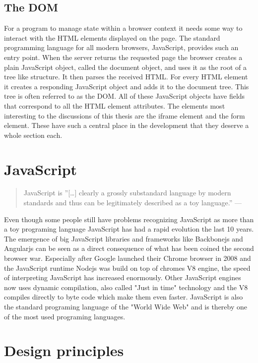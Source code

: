 \documentclass[english]{ifimaster}
\begin{document}
\subsection{The DOM}
For a program to manage state within a browser context it needs some way to interact with the HTML elements displayed on the page. The standard programming language for all modern browsers, JavaScript, provides such an entry point. When the server returns the requested page the browser creates a plain JavaScript object, called the document object, and uses it as the root of a tree like structure. It then parses the received HTML. For every HTML element it creates a responding JavaScript object and adds it to the document tree. This tree is often referred to as the DOM. All of these JavaScript objects have fields that correspond to all the HTML element attributes. The elements most interesting to the discussions of this thesis are the iframe element and the form element. These have such a central place in the development that they deserve a whole section each.


\section{JavaScript}
\begin{quotation}
\noindent JavaScript is ”[…] clearly a grossly substandard language by modern
standards and thus can be legitimately described as a toy language.” —
\parencite{arno}
\end{quotation}

Even though some people still have problems recognizing JavaScript as more than a toy programing language JavaScript has had a rapid evolution the last 10 years. The emergence of  big JavaScript libraries and frameworks like Backbonejs and Angularjs can be seen as a direct consequence of what has been coined the second browser war\parencite{Yule2013}. Especially after Google launched their Chrome browser in 2008 and the JavaScript runtime Nodejs was build on top of chromes V8 engine, the speed of interpreting JavaScript has increased enormously. Other JavaScript engines now uses dynamic compilation, also called "Just in time" technology and the V8 compiles directly to byte code which make them even faster\parencite{anand}. JavaScript is also the standard programing language of the "World Wide Web"\parencite[p. 1]{flanagan} and is thereby one of the most used programing languages.



\section{Design principles}
\end{document}
